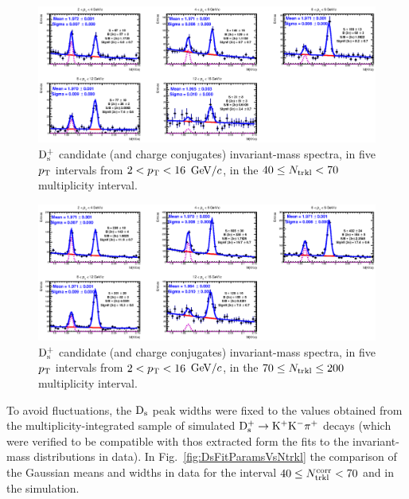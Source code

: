 \begin{figure}[htpb]
\centering
 \includegraphics[width=1\textwidth]{FigCap6/DsMass_4070Trkl.eps}
  \caption{${\rm D_s^+}$ candidate (and charge conjugates) invariant-mass spectra, in five $p_{\rm T}$ intervals from $2 < p_{\rm T} < 16$ $\mathrm{GeV}/c$, in the $40 \leq N_{\rm trkl} < 70$ multiplicity interval.}
 \label{fig:DsInvMassVsNtrkl_2}
\end{figure}
\begin{figure}[htpb]
\centering
 \includegraphics[width=1\textwidth]{FigCap6/DsMass_70200Trkl.eps}
  \caption{${\rm D_s^+}$ candidate (and charge conjugates) invariant-mass spectra, in five $p_{\rm T}$ intervals from $2 < p_{\rm T} < 16$ $\mathrm{GeV}/c$, in the $70 \leq N_{\rm trkl} \leq 200$ multiplicity interval.}
 \label{fig:DsInvMassVsNtrkl_3}
\end{figure}
To avoid fluctuations, the ${\rm D_s}$ peak widths were fixed to the values obtained from the 
multiplicity-integrated sample of simulated ${\rm D^{+}_\mathrm{s}\to K^+ K^-\pi^+}$ decays (which were verified to be compatible with thos
extracted form the fits to the invariant-mass distributions in data). In Fig.~\ref{fig:DsFitParamsVsNtrkl} 
the comparison of the Gaussian means and widths 
in data for the interval $40 \leq N_{\rm trkl}^{\rm corr} < 70$ and in the simulation. 

